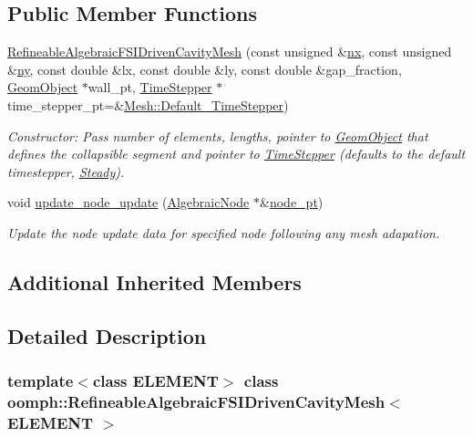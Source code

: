 \subsection*{Public Member Functions}
\begin{DoxyCompactItemize}
\item 
\hyperlink{classoomph_1_1RefineableAlgebraicFSIDrivenCavityMesh_a123b12382b582eb20dd2749d9f85cd8c}{Refineable\+Algebraic\+F\+S\+I\+Driven\+Cavity\+Mesh} (const unsigned \&\hyperlink{classoomph_1_1SimpleRectangularQuadMesh_a4ff7678ec433180e2245ea2147f222b7}{nx}, const unsigned \&\hyperlink{classoomph_1_1SimpleRectangularQuadMesh_a45011f22dedd480392b1f376e4269921}{ny}, const double \&lx, const double \&ly, const double \&gap\+\_\+fraction, \hyperlink{classoomph_1_1GeomObject}{Geom\+Object} $\ast$wall\+\_\+pt, \hyperlink{classoomph_1_1TimeStepper}{Time\+Stepper} $\ast$time\+\_\+stepper\+\_\+pt=\&\hyperlink{classoomph_1_1Mesh_a12243d0fee2b1fcee729ee5a4777ea10}{Mesh\+::\+Default\+\_\+\+Time\+Stepper})
\begin{DoxyCompactList}\small\item\em Constructor\+: Pass number of elements, lengths, pointer to \hyperlink{classoomph_1_1GeomObject}{Geom\+Object} that defines the collapsible segment and pointer to \hyperlink{classoomph_1_1TimeStepper}{Time\+Stepper} (defaults to the default timestepper, \hyperlink{classoomph_1_1Steady}{Steady}). \end{DoxyCompactList}\item 
void \hyperlink{classoomph_1_1RefineableAlgebraicFSIDrivenCavityMesh_aa68685323573763e1ded0cceed5ad14f}{update\+\_\+node\+\_\+update} (\hyperlink{classoomph_1_1AlgebraicNode}{Algebraic\+Node} $\ast$\&\hyperlink{classoomph_1_1AlgebraicMesh_aedeebbe95d2f8e67e9939cecd1be3933}{node\+\_\+pt})
\begin{DoxyCompactList}\small\item\em Update the node update data for specified node following any mesh adapation. \end{DoxyCompactList}\end{DoxyCompactItemize}
\subsection*{Additional Inherited Members}


\subsection{Detailed Description}
\subsubsection*{template$<$class E\+L\+E\+M\+E\+NT$>$\newline
class oomph\+::\+Refineable\+Algebraic\+F\+S\+I\+Driven\+Cavity\+Mesh$<$ E\+L\+E\+M\+E\+N\+T $>$}

